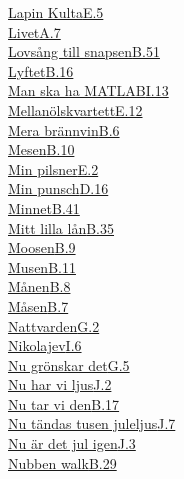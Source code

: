   \hyperref[lapinkulta]{Lapin Kulta}\dotfill\hyperref[lapinkulta]{E.5}\\
  \hyperref[livet]{Livet}\dotfill\hyperref[livet]{A.7}\\
  \hyperref[lovsangtillsnapsen]{Lovsång till snapsen}\dotfill\hyperref[lovsangtillsnapsen]{B.51}\\
  \hyperref[lyftet]{Lyftet}\dotfill\hyperref[lyftet]{B.16}\\
  \hyperref[matlab]{Man ska ha MATLAB}\dotfill\hyperref[matlab]{I.13}\\
  \hyperref[mellanolskvartett]{Mellanölskvartett}\dotfill\hyperref[mellanolskvartett]{E.12}\\
  \hyperref[merabrannvin]{Mera brännvin}\dotfill\hyperref[merabrannvin]{B.6}\\
  \hyperref[mesen]{Mesen}\dotfill\hyperref[mesen]{B.10}\\
  \hyperref[minpilsner]{Min pilsner}\dotfill\hyperref[minpilsner]{E.2}\\
  \hyperref[minpunsch]{Min punsch}\dotfill\hyperref[minpunsch]{D.16}\\
  \hyperref[minnet]{Minnet}\dotfill\hyperref[minnet]{B.41}\\
  \hyperref[mittlillalan]{Mitt lilla lån}\dotfill\hyperref[mittlillalan]{B.35}\\
  \hyperref[moosen]{Moosen}\dotfill\hyperref[moosen]{B.9}\\
  \hyperref[musen]{Musen}\dotfill\hyperref[musen]{B.11}\\
  \hyperref[manen]{Månen}\dotfill\hyperref[manen]{B.8}\\
  \hyperref[masen]{Måsen}\dotfill\hyperref[masen]{B.7}\\
  \hyperref[nattvarden]{Nattvarden}\dotfill\hyperref[nattvarden]{G.2}\\
  \hyperref[nikolajev]{Nikolajev}\dotfill\hyperref[nikolajev]{I.6}\\
  \hyperref[nugronskardet]{Nu grönskar det}\dotfill\hyperref[nugronskardet]{G.5}\\
  \hyperref[nuharviljus]{Nu har vi ljus}\dotfill\hyperref[nuharviljus]{J.2}\\
  \hyperref[nutarviden]{Nu tar vi den}\dotfill\hyperref[nutarviden]{B.17}\\
  \hyperref[nutandas]{Nu tändas tusen juleljus}\dotfill\hyperref[nutandas]{J.7}\\
  \hyperref[nuardetjuligen]{Nu är det jul igen}\dotfill\hyperref[nuardetjuligen]{J.3}\\
  \hyperref[nubbenwalk]{Nubben walk}\dotfill\hyperref[nubbenwalk]{B.29}\\
